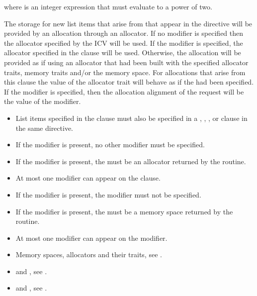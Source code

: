 where  is an integer expression that must evaluate to a power of two.
\descr

The storage for new list items that arise from  that appear in the directive will be provided by an allocation through an allocator. If no modifier is specified then the allocator specified by the  ICV will be used. If the  modifier is specified, the allocator specified in the clause will be used. Otherwise, the allocation will be provided as if using an allocator that had been built with the specified allocator traits, memory traits and/or the  memory space. For allocations that arise from this clause the  value of the  allocator trait will behave as if the  had been specified. If the  modifier is specified, then the allocation alignment of the request will be the value of the  modifier.

\restrictions
\begin{itemize}
\item List items specified in the  clause must also be specified in a , , ,  or 
       clause in the same directive.
\item If the  modifier is present, no other modifier must be specified.
\item If the  modifier is present, the  must be an allocator returned by the  routine.
\item At most one  modifier can appear on the  clause.
\item If the  modifier is present, the   modifier must not be specified.
\item If the  modifier is present, the  must be a memory space returned by the  routine.
\item At most one  modifier can appear on the  modifier.
\end{itemize}

\crossreferences
\begin{itemize}
\item Memory spaces, allocators and their traits, see .
\ccppspecificstart
\item {} and , see .
\ccppspecificend
\fortranspecificstart
\item {} and , see .
\fortranspecificend
\end{itemize}